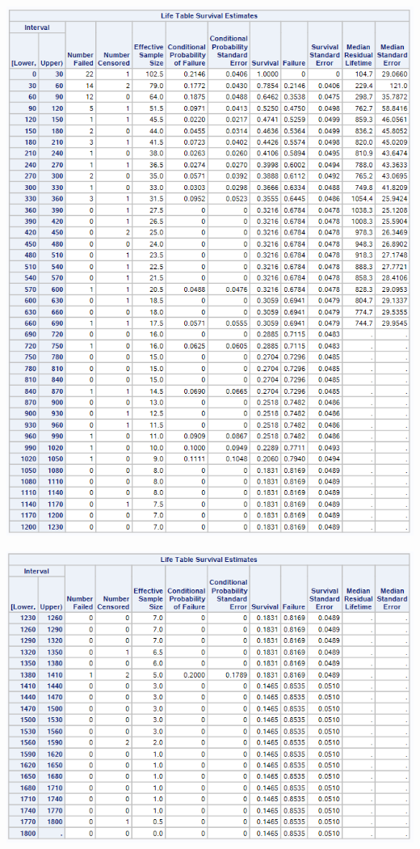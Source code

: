\documentclass[
  12pt,
  letterpaper,
  DIV=11,
  numbers=noendperiod,
  onepage,
  openany]{scrreprt}
\begin{document}
\includegraphics{sas/1a.PNG}

\includegraphics{sas/1b.PNG}
\end{document}
